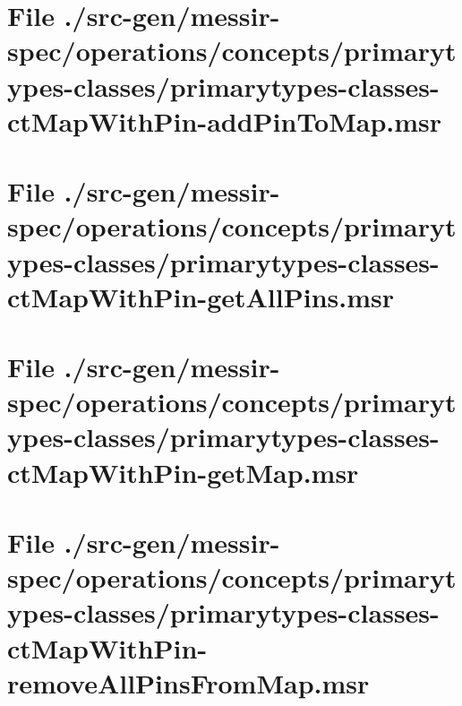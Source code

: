 \section[File /src-gen/messir-spec.../primarytypes-classes-ctMapWithPin-addPinToMap.msr]{File ./src-gen/messir-spec/operations/concepts/primarytypes-classes/primarytypes-classes-ctMapWithPin-addPinToMap.msr}
\scriptsize

\normalsize
	
\section[File /src-gen/messir-spec.../primarytypes-classes-ctMapWithPin-getAllPins.msr]{File ./src-gen/messir-spec/operations/concepts/primarytypes-classes/primarytypes-classes-ctMapWithPin-getAllPins.msr}
\scriptsize

\normalsize
	
\section[File /src-gen/messir-spec.../primarytypes-classes-ctMapWithPin-getMap.msr]{File ./src-gen/messir-spec/operations/concepts/primarytypes-classes/primarytypes-classes-ctMapWithPin-getMap.msr}
\scriptsize

\normalsize
	
\section[File /src-gen.../primarytypes-classes-ctMapWithPin-removeAllPinsFromMap.msr]{File ./src-gen/messir-spec/operations/concepts/primarytypes-classes/primarytypes-classes-ctMapWithPin-removeAllPinsFromMap.msr}
\scriptsize

\normalsize
	
